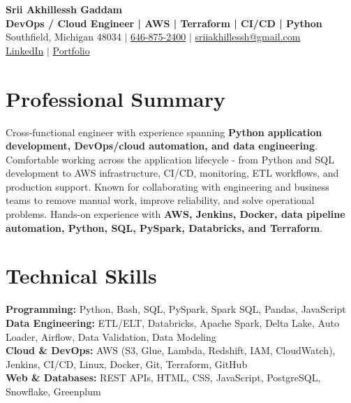 \documentclass[letterpaper,10pt]{article}
\begin{document}
\fontsize{9.35pt}{10.45pt}\selectfont

\begin{center}
    {\LARGE \textbf{Srii Akhillessh Gaddam}} \\[-1pt]
    \textbf{DevOps / Cloud Engineer | AWS | Terraform | CI/CD | Python} \\[2pt]
    Southfield, Michigan 48034 $|$
    \href{tel:6468752400}{646-875-2400} $|$
    \href{mailto:sriiakhillessh@gmail.com}{sriiakhillessh@gmail.com} \\[1pt]
    \href{https://www.linkedin.com/in/srii-akhiilessh-gaddam-b48668191/}{LinkedIn} $|$
    \href{https://sriiakhillesshg.github.io/portfolio/}{Portfolio}
\end{center}
\vspace{-8pt}

\section{Professional Summary}
\small{Cross-functional engineer with experience spanning \textbf{Python application development, DevOps/cloud automation, and data engineering}. Comfortable working across the application lifecycle - from Python and SQL development to AWS infrastructure, CI/CD, monitoring, ETL workflows, and production support. Known for collaborating with engineering and business teams to remove manual work, improve reliability, and solve operational problems. Hands-on experience with \textbf{AWS, Jenkins, Docker, data pipeline automation, Python, SQL, PySpark, Databricks, and Terraform}.}

\section{Technical Skills}
\small{
\textbf{Programming:} Python, Bash, SQL, PySpark, Spark SQL, Pandas, JavaScript \\
\textbf{Data Engineering:} ETL/ELT, Databricks, Apache Spark, Delta Lake, Auto Loader, Airflow, Data Validation, Data Modeling \\
\textbf{Cloud \& DevOps:} AWS (S3, Glue, Lambda, Redshift, IAM, CloudWatch), Jenkins, CI/CD, Linux, Docker, Git, Terraform, GitHub \\
\textbf{Web \& Databases:} REST APIs, HTML, CSS, JavaScript, PostgreSQL, Snowflake, Greenplum
}
\end{document}
